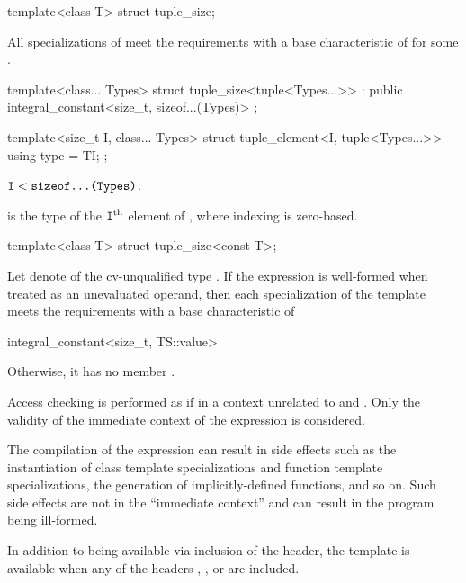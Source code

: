 %
\begin{itemdecl}
template<class T> struct tuple_size;
\end{itemdecl}

\begin{itemdescr}
\pnum
All specializations of  meet the
 requirements with a
base characteristic of 
for some .
\end{itemdescr}

%
\begin{itemdecl}
template<class... Types>
  struct tuple_size<tuple<Types...>> : public integral_constant<size_t, sizeof...(Types)> { };
\end{itemdecl}

%
\begin{itemdecl}
template<size_t I, class... Types>
  struct tuple_element<I, tuple<Types...>> {
    using type = TI;
  };
\end{itemdecl}

\begin{itemdescr}
\pnum
\mandates
$\texttt{I} < \texttt{sizeof...(Types)}$.

\pnum
\ctype
{} is the
type of the $\texttt{I}^\text{th}$ element of ,
where indexing is zero-based.
\end{itemdescr}

%
\begin{itemdecl}
template<class T> struct tuple_size<const T>;
\end{itemdecl}

\begin{itemdescr}
\pnum
Let  denote  of the cv-unqualified type .
If the expression  is well-formed
when treated as an unevaluated operand, then
each specialization of the template meets the  requirements
with a base characteristic of
\begin{codeblock}
integral_constant<size_t, TS::value>
\end{codeblock}
Otherwise, it has no member .

\pnum
Access checking is performed as if in a context
unrelated to  and .
Only the validity of the immediate context of the expression is considered.
\begin{note}
The compilation of the expression can result in side effects
such as the instantiation of class template specializations and
function template specializations, the generation of implicitly-defined functions, and so on.
Such side effects are not in the ``immediate context'' and
can result in the program being ill-formed.
\end{note}

\pnum
In addition to being available via inclusion of the  header,
the template is available
when any of the headers
,
, or
are included.
\end{itemdescr}

